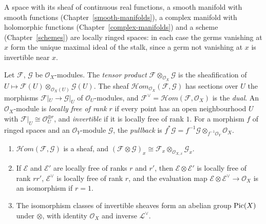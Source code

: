 \begin{example}\label{sheaves:example-ringed-spaces}
A space with its sheaf of continuous real functions, a smooth manifold with smooth functions (Chapter~\ref{smooth-manifolds}), a complex manifold with holomorphic functions
(Chapter~\ref{complex-manifolds}) and a scheme (Chapter~\ref{schemes}) are locally ringed spaces: in each case the germs vanishing at $x$ form the unique maximal ideal of the stalk, since a
germ not vanishing at $x$ is invertible near $x$.
\end{example}

\begin{definition}\label{sheaves:definition-module-operations}
Let $\mathcal{F}$, $\mathcal{G}$ be $\mathcal{O}_X$-modules. The \emph{tensor product} $\mathcal{F} \otimes_{\mathcal{O}_X} \mathcal{G}$ is the sheafification of
$U \mapsto \mathcal{F}(U) \otimes_{\mathcal{O}_X(U)} \mathcal{G}(U)$. The sheaf $\mathcal{H}om_{\mathcal{O}_X}(\mathcal{F}, \mathcal{G})$ has sections over $U$ the morphisms
$\mathcal{F}|_U \to \mathcal{G}|_U$ of $\mathcal{O}_U$-modules, and $\mathcal{F}^\vee = \mathcal{H}om(\mathcal{F}, \mathcal{O}_X)$ is the \emph{dual}. An $\mathcal{O}_X$-module is
\emph{locally free of rank $r$} if every point has an open neighbourhood $U$ with $\mathcal{F}|_U \cong \mathcal{O}_U^{\oplus r}$, and \emph{invertible} if it is locally free of rank $1$.
For a morphism $f$ of ringed spaces and an $\mathcal{O}_Y$-module $\mathcal{G}$, the \emph{pullback} is $f^*\mathcal{G} = f^{-1}\mathcal{G} \otimes_{f^{-1}\mathcal{O}_Y} \mathcal{O}_X$.
\end{definition}

\begin{proposition}\label{sheaves:proposition-modules}
\begin{enumerate}
\item $\mathcal{H}om(\mathcal{F}, \mathcal{G})$ is a sheaf, and $(\mathcal{F} \otimes \mathcal{G})_x \cong \mathcal{F}_x \otimes_{\mathcal{O}_{X,x}} \mathcal{G}_x$.
\item If $\mathcal{E}$ and $\mathcal{E}'$ are locally free of ranks $r$ and $r'$, then $\mathcal{E} \otimes \mathcal{E}'$ is locally free of rank $rr'$, $\mathcal{E}^\vee$ is locally free of rank
$r$, and the evaluation map $\mathcal{E} \otimes \mathcal{E}^\vee \to \mathcal{O}_X$ is an isomorphism if $r = 1$.
\item The isomorphism classes of invertible sheaves form an abelian group $\operatorname{Pic}(X)$ under $\otimes$, with identity $\mathcal{O}_X$ and inverse $\mathcal{L}^\vee$.
\end{enumerate}
\end{proposition}

